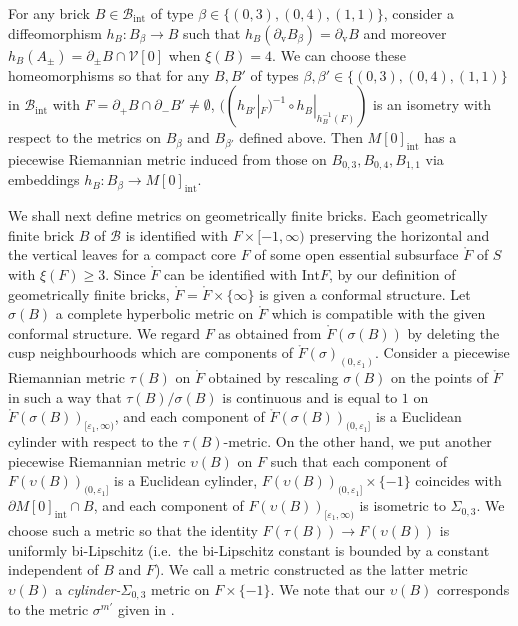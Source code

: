 \documentclass{amsart}
\theoremstyle{definition}
\numberwithin{figure}{section}
\numberwithin{equation}{section}
\newcommand{\ie}{i.e.\ }
\def\v{\mathrm{v}}
\def\cb{\mathcal{B}}
\def\cv{\mathcal{V}}
\def\eset{\emptyset}
\def\part{\partial}
\def\Int{\mathrm{Int}}
\def\ve{\varepsilon}
\def\Sg{\Sigma}
\def\sg{\sigma}
\def\ve{\varepsilon}
\def\Sg{\Sigma}
\begin{document}
For any brick $B\in \cb_{\mathrm{int}}$ of type $\beta\in \{(0,3),(0,4),(1,1)\}$, consider a diffeomorphism  
$h_B:B_\beta\rightarrow B$ such that $h_B(\part_{\v}B_{\beta})=\part_{\v}B$ and 
moreover $h_B(A_\pm)=\part_\pm B\cap \cv[0]$ when $\xi(B)=4$.
We can choose these homeomorphisms so that  for any $B,B'$ of types $\beta, \beta' \in \{(0,3),(0,4), (1,1)\}$ in $\cb_{\mathrm{int}}$ with 
$F=\part_+ B\cap \part_- {B'}\neq \eset$, $((h_{B'}|_{F})^{-1}\circ h_B|_{h_B^{-1}(F)}) $ is 
an isometry with respect to the metrics on $B_\beta$ and $B_{\beta'}$ defined above.
Then $M[0]_{\mathrm{int}}$ has a piecewise Riemannian metric induced from those on $B_{0,3},B_{0,4},B_{1,1}$ via 
embeddings $h_B:B_\beta \rightarrow M[0]_{\mathrm{int}}$.



We shall next define metrics on  geometrically finite bricks. 
Each geometrically finite brick $B$ of $\cb$ is identified with $F\times [-1,\infty)$ preserving the horizontal and the vertical leaves  for a 
compact core $F$ of some open  essential subsurface $\mathring F$ of $S$ with $\xi(F) \geq 3$.
Since $\mathring F$ can be identified with $\Int F$, by our definition of geometrically finite bricks,  $\mathring F=\mathring F\times \{\infty\}$ is given a conformal structure.
Let $\sigma(B)$ a complete hyperbolic metric on $\mathring F$ which is compatible with the given conformal structure.
We regard $F$ as obtained from $\mathring F(\sg(B))$ by deleting the cusp neighbourhoods which are components of
$\mathring F(\sg)_{(0,\ve_1)}$.
Consider a piecewise Riemannian metric $\tau(B)$ on $\mathring F$ obtained by rescaling $\sg(B)$ on the points of $\mathring F$ in such a way that $\tau(B)/\sg(B)$ is  continuous and is equal 
to $1$ on $\mathring F(\sg(B))_{[\ve_1,\infty)}$, and each component of $\mathring F(\sg(B))_{(0,\ve_1]}$ is a Euclidean cylinder with 
respect to the $\tau(B)$-metric.
On the other hand, we put another piecewise Riemannian metric $\upsilon(B)$ on $F$ such that 
each component of $F(\upsilon(B))_{(0,\ve_1]}$ is a Euclidean cylinder, 
$F(\upsilon(B))_{(0,\ve_1]}\times \{-1\}$ coincides with $\part M[0]_{\mathrm{int}}\cap B$,
and each component of $F(\upsilon(B))_{[\ve_1, \infty)}$ is isometric to $\Sg_{0,3}$. 
We choose such a metric so that the identity $F(\tau(B))
\rightarrow F(\upsilon(B))$ is uniformly bi-Lipschitz (\ie the bi-Lipschitz constant is bounded by a constant independent of $B$ and $F$).
We call a metric constructed  as the latter metric $\upsilon(B)$ a {\em cylinder-$\Sigma_{0,3}$} metric on $F \times \{-1\}$.
We note that  our $\upsilon(B)$ corresponds to the metric $\sg^{m'}$ given in \cite[Subsection 8.3]{mi2}.
\end{document}
